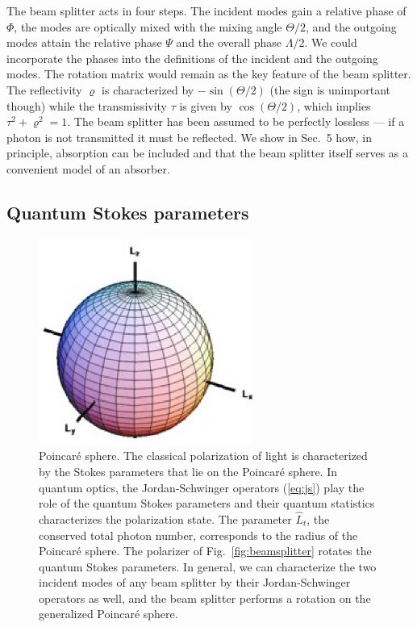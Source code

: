 \documentclass[12pt,amsmath,amssymb]{article}
\numberwithin{equation}{section}
\begin{document}
The beam splitter acts in four steps. The incident modes gain a
relative phase of $\Phi$, the modes are optically mixed with the
mixing angle $\Theta/2$, and the outgoing modes attain the
relative phase $\Psi$ and the overall phase $\Lambda/2$. We could
incorporate the phases into the definitions of the incident and
the outgoing modes. The rotation matrix would remain as the key
feature of the beam splitter. The reflectivity $\varrho$ is
characterized by $-\sin(\Theta/2)$ (the sign is unimportant
though) while the transmissivity $\tau$ is given by
$\cos(\Theta/2)$, which implies $\tau^2+\varrho^2=1$. The beam
splitter has been assumed to be perfectly lossless --- if a photon
is not transmitted it must be reflected. We show in Sec.\ 5 how,
in principle, absorption can be included and that the beam
splitter itself serves as a convenient model of an absorber.

\subsection{Quantum Stokes parameters}

\begin{figure}
\begin{center}
\includegraphics[width=7cm]{fig2.eps}
\end{center}
\caption{\label{fig:sphere}Poincar\'e sphere.
The classical polarization of light is characterized by the
Stokes parameters that lie on the Poincar\'e sphere.
In quantum optics, the Jordan-Schwinger operators (\ref{eq:js})
play the role of the quantum Stokes parameters
and their quantum statistics characterizes the
polarization state.
The parameter $\hat{L}_t$,
the conserved total photon number,
corresponds to the radius of the Poincar\'e sphere.
The polarizer of Fig.\ \ref{fig:beamsplitter}
rotates the quantum Stokes parameters.
In general, we can characterize the two incident modes
of any beam splitter
by their Jordan-Schwinger operators as well,
and the beam splitter performs
a rotation on the generalized Poincar\'e sphere.}
\end{figure}
\end{document}
